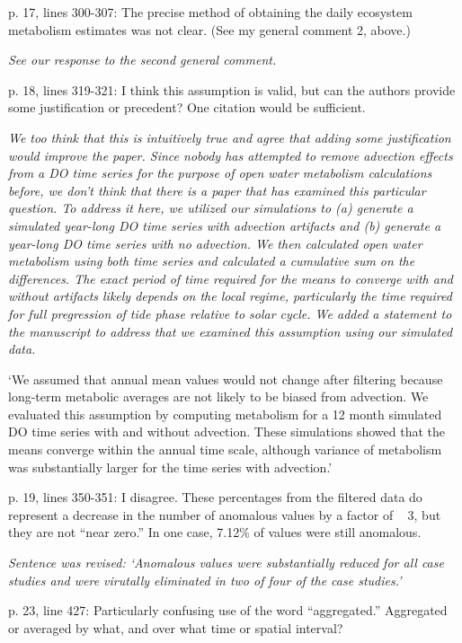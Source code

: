 \documentclass[letterpaper,12pt]{article}\usepackage[]{graphicx}\usepackage[]{color}
\begin{document}
p. 17, lines 300-307: The precise method of obtaining the daily ecosystem metabolism estimates was not clear. (See my general comment 2, above.)

{\it See our response to the second general comment.}

p. 18, lines 319-321: I think this assumption is valid, but can the authors provide some justification or precedent? One citation would be sufficient.

{\it We too think that this is intuitively true and agree that adding some justification would improve the paper.  Since nobody has attempted to remove advection effects from a DO time series for the purpose of open water metabolism calculations before, we don’t think that there is a paper that has examined this particular question.  To address it here, we utilized our simulations to (a) generate a simulated year-long DO time series with advection artifacts and (b) generate a year-long DO time series with no advection.  We then calculated open water metabolism using both time series and calculated a cumulative sum on the differences.  The exact period of time required for the means to converge with and without artifacts likely depends on the local regime, particularly the time required for full pregression of tide phase relative to solar cycle. We added a statement to the manuscript to address that we examined this assumption using our simulated data.

`We assumed that annual mean values would not change after filtering because long-term metabolic averages are not likely to be biased from advection. We evaluated this assumption by computing metabolism for a 12 month simulated DO time series with and without advection.  These simulations showed that the means converge within the annual time scale, although variance of metabolism was substantially larger for the time series with advection.'
}

p. 19, lines 350-351: I disagree. These percentages from the filtered data do represent a decrease
in the number of anomalous values by a factor of ~ 3, but they are not “near zero.” In one case,
7.12\% of values were still anomalous.

{\it Sentence was revised: `Anomalous values were substantially reduced for all case studies and were virutally eliminated in two of four of the case studies.'}

p. 23, line 427: Particularly confusing use of the word “aggregated.” Aggregated or averaged by
what, and over what time or spatial interval?
\end{document}
